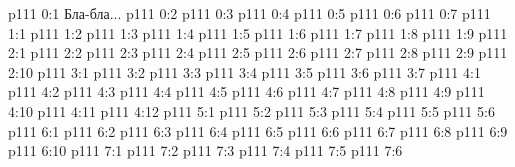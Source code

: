 \author{Одиночный Посланник}
\vs p111 0:1  Бла-бла...
\vs p111 0:2 \pc 
\vs p111 0:3 
\vs p111 0:4 
\vs p111 0:5 
\vs p111 0:6 
\vs p111 0:7 
\vs p111 1:1 
\vs p111 1:2 
\vs p111 1:3 \pc 
\vs p111 1:4 \pc 
\vs p111 1:5 
\vs p111 1:6 
\vs p111 1:7 \pc 
\vs p111 1:8 
\vs p111 1:9 \pc 
{}
\vs p111 2:1 
\vs p111 2:2 
\vs p111 2:3 
\vs p111 2:4 \pc 
\vs p111 2:5 
\vs p111 2:6 
\vs p111 2:7 
\vs p111 2:8 \pc 
\vs p111 2:9 
\vs p111 2:10 
\vs p111 3:1 
\vs p111 3:2 
\vs p111 3:3 
\vs p111 3:4 
\vs p111 3:5 
\vs p111 3:6 
\vs p111 3:7 
\vs p111 4:1 
\vs p111 4:2 
\vs p111 4:3 \pc 
\vs p111 4:4 
\vs p111 4:5 
\vs p111 4:6 \pc 
\vs p111 4:7 \pc 
\vs p111 4:8 \pc 
\vs p111 4:9 
\vs p111 4:10 
\vs p111 4:11 
\vs p111 4:12 \pc 
{}
\vs p111 5:1 
\vs p111 5:2 
\vs p111 5:3 
\vs p111 5:4 
\vs p111 5:5 
\vs p111 5:6 
\vs p111 6:1 
\vs p111 6:2 
\vs p111 6:3 \pc 
\vs p111 6:4 \pc 
\vs p111 6:5 
\vs p111 6:6 
\vs p111 6:7 
\vs p111 6:8 \pc 
\vs p111 6:9 \pc 
\vs p111 6:10 \pc 
{}
\vs p111 7:1 
\vs p111 7:2 \pc 
\vs p111 7:3 
\vs p111 7:4 
\vs p111 7:5 \pc 
\vsetoff
\vs p111 7:6 
\quizlink
